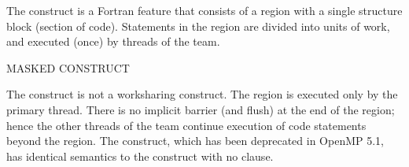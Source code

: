 The  construct is a Fortran feature that consists of a
region with a single structure block (section of code). Statements in the
 region are divided into units of work, and executed (once)
by threads of the team.  

\bigskip
MASKED CONSTRUCT

The  construct is not a worksharing construct.  The  region is
executed only by the primary thread. There is no implicit barrier (and flush) 
at the end of the  region; hence the other threads of the team continue
execution of code statements beyond the  region.
The  construct, which has been deprecated in OpenMP 5.1, has identical semantics
to the  construct with no  clause.





















